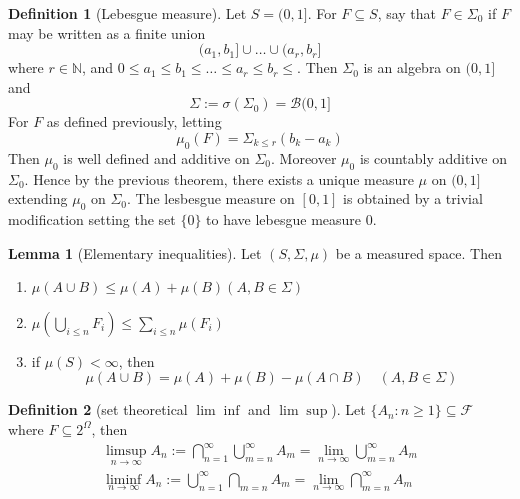 \documentclass[12pt]{article}
\theoremstyle{definition}
\newtheorem{definition}{Definition}[section]
\newtheorem{lemma}[theorem]{Lemma}
\begin{document}
\begin{definition}[Lebesgue measure]
	Let $S = (0,1]$. For $F \subseteq S$, say that $F \in \Sigma_0$ if $F$ may be written as a finite union 
	$$
		(a_1,b_1] \cup \ldots \cup (a_r, b_r]
	$$
	where $r \in \mathbb{N}$, and $0 \leq a_1 \leq b_1 \leq \ldots \leq a_r \leq b_r \leq $. Then $\Sigma_0$ is an algebra on $(0,1]$ and
	$$
		\Sigma := \sigma(\Sigma_0) = \mathcal{B}(0,1]
	$$
	For $F$ as defined previously, letting 
	$$
		\mu_0(F) = \Sigma_{k \leq r}(b_k -a_k)
	$$
	Then $\mu_0$ is well defined and additive on $\Sigma_0$. Moreover $\mu_0$ is countably additive on $\Sigma_0$. Hence by the previous theorem, there exists a unique measure $\mu$ on $(0,1]$ extending $\mu_0$ on $\Sigma_0$. The lesbesgue measure on $[0,1]$ is obtained by a trivial modification setting the set $\{0\}$ to have lebesgue measure 0.
\end{definition}
\begin{lemma}[Elementary inequalities]
	Let $(S,\Sigma,\mu)$ be a measured space. Then 
	\begin{enumerate}
		\item $\mu(A\cup B) \leq \mu(A) + \mu(B) (A,B \in \Sigma)$
		\item $\mu\left(\bigcup_{i \leq n} F_i\right) \leq \sum_{i \leq n} \mu(F_i)$
		\item if $\mu(S) < \infty$, then 
			$$
				\mu(A \cup B) = \mu(A) + \mu(B) - \mu(A \cap B) \quad (A,B \in \Sigma)
			$$
		
	\end{enumerate}
	\end{lemma}
\begin{definition}[set theoretical $\lim \inf$ and $\lim \sup$]
Let $\{A_n \colon n \geq 1\} \subseteq \mathcal{F}$ where $F \subseteq 2^\Omega$, then 
\begin{align}
	\limsup_{n \to \infty} A_n := \bigcap_{n = 1}^\infty \bigcup_{m=n}^\infty A_m = \lim_{n \to \infty} \bigcup_{m=n}^\infty A_m \\
	\liminf_{n \to \infty} A_n := \bigcup_{n = 1}^\infty \bigcap_{m=n} A_m = \lim_{n \to \infty} \bigcap_{m=n}^\infty A_m
\end{align}

	
\end{definition}
\end{document}
